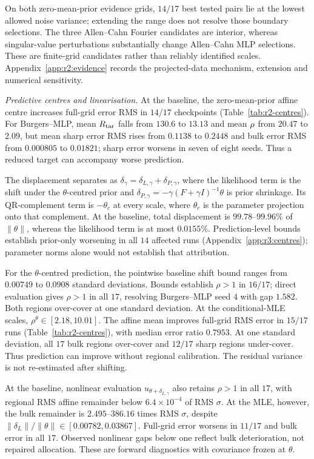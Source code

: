 On both zero-mean-prior evidence grids, $14/17$ best tested pairs lie at the lowest allowed noise
variance; extending the range does not resolve those boundary selections.
The three Allen--Cahn Fourier candidates are interior, whereas singular-value
perturbations substantially change Allen--Cahn MLP selections. These are finite-grid
candidates rather than reliably identified scales. Appendix~\ref{app:r2:evidence}
records the projected-data mechanism, extension and numerical sensitivity.

\emph{Predictive centres and linearisation.}
At the baseline, the zero-mean-prior affine centre increases full-grid error RMS in $14/17$ checkpoints
(Table~\ref{tab:r2-centres}). For Burgers--MLP, mean $R_{\mathrm{tar}}$ falls from $130.6$ to $13.13$
and mean $\rho$ from $20.47$ to $2.09$, but mean sharp error RMS rises from $0.1138$
to $0.2448$ and bulk error RMS from $0.000805$ to $0.01821$; sharp error worsens in seven
of eight seeds. Thus a reduced target can accompany worse prediction.

The displacement separates as $\delta_\gamma=\delta_{L,\gamma}+\delta_{P,\gamma}$,
where the likelihood term is the shift under the $\theta$-centred prior and
$\delta_{P,\gamma}=-\gamma(F+\gamma I)^{-1}\theta$ is prior shrinkage. Its QR-complement
term is $-\theta_c$ at every scale, where $\theta_c$ is the parameter projection
onto that complement. At the baseline, total displacement is
$99.78$--$99.96\%$ of $\|\theta\|$, whereas the likelihood term is at most
$0.0155\%$. Prediction-level bounds establish prior-only worsening in all $14$
affected runs (Appendix~\ref{app:r3:centres}); parameter norms alone would not
establish that attribution.

For the $\theta$-centred prediction, the pointwise baseline shift bound ranges from
$0.00749$ to $0.0908$ standard deviations. Bounds establish $\rho>1$ in $16/17$;
direct evaluation gives $\rho>1$ in all $17$, resolving Burgers--MLP seed $4$ with gap $1.582$.
Both regions over-cover at one standard deviation. At the conditional-MLE
scales, $\rho^\theta\in[2.18,10.01]$. The affine mean improves full-grid RMS error
in $15/17$ runs (Table~\ref{tab:r2-centres}), with median error ratio $0.7953$.
At one standard deviation, all $17$ bulk regions over-cover and $12/17$ sharp regions
under-cover. Thus prediction can improve without
regional calibration. The residual variance is not re-estimated after shifting.

At the baseline, nonlinear evaluation $u_{\theta+\delta_{L,\gamma}}$ also retains
$\rho>1$ in all $17$, with regional RMS affine remainder below $6.4\times10^{-4}$
of RMS $\sigma$. At the MLE, however, the bulk remainder is $2.495$--$386.16$ times
RMS $\sigma$, despite $\|\delta_L\|/\|\theta\|\in[0.00782,0.03867]$.
Full-grid error worsens in $11/17$ and bulk error in all $17$.
Observed nonlinear gaps below one reflect bulk deterioration, not repaired allocation.
These are forward diagnostics with covariance frozen at $\theta$.

